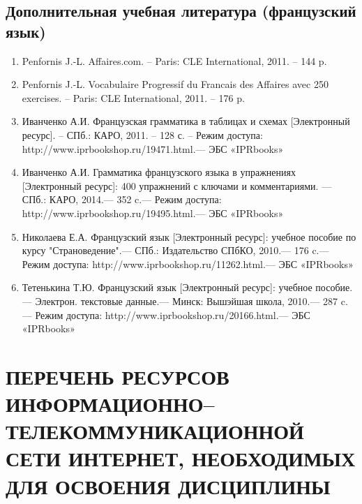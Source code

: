 \section{Дополнительная учебная литература (французский язык)}
\begin{enumerate}
\item Penfornis J.-L. Affaires.com. – Paris: CLE International, 2011. – 144 p.
\item Penfornis J.-L. Vocabulaire Progressif du Francais des Affaires avec 250 exercises. – Paris: CLE International, 2011. – 176 p.
\item Иванченко А.И. Французская грамматика в таблицах и схемах [Электронный ресурс]. – СПб.: КАРО, 2011. – 128 с. – Режим доступа: http://www.iprbookshop.ru/19471.html.— ЭБС «IPRbooks»
\item Иванченко А.И. Грамматика французского языка в упражнениях [Электронный ресурс]: 400 упражнений с ключами и комментариями. — СПб.: КАРО, 2014.— 352 c.— Режим доступа: http://www.iprbookshop.ru/19495.html.— ЭБС «IPRbooks»
\item Николаева Е.А. Французский язык [Электронный ресурс]: учебное пособие по курсу "Страноведение".— СПб.: Издательство СПбКО, 2010.— 176 c.— Режим доступа: http://www.iprbookshop.ru/11262.html.— ЭБС «IPRbooks»
\item Тетенькина Т.Ю. Французский язык [Электронный ресурс]: учебное пособие.— Электрон. текстовые данные.— Минск: Вышэйшая школа, 2010.— 287 c.— Режим доступа: http://www.iprbookshop.ru/20166.html.— ЭБС «IPRbooks»
\end{enumerate}

\chapter{ПЕРЕЧЕНЬ РЕСУРСОВ ИНФОРМАЦИОННО–ТЕЛЕКОММУНИКАЦИОННОЙ СЕТИ ИНТЕРНЕТ, НЕОБХОДИМЫХ ДЛЯ ОСВОЕНИЯ ДИСЦИПЛИНЫ}
\label{chapt8}
